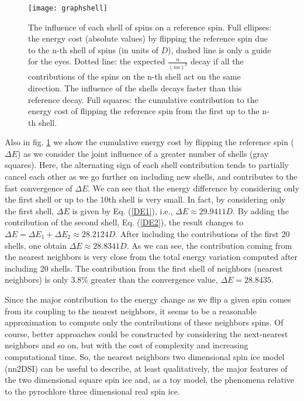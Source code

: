 \documentclass[aps,showkeys,groupedaddress]{revtex4}
\begin{document}
\begin{figure}[ht]
\begin{center}
\texttt{[image: graphshell]}
\end{center}
\caption{The influence of each shell of spins on a reference spin. Full ellipses: the energy cost (absolute values) by flipping the reference spin due to the n-th shell of spins (in units of $D$), dashed line is only a guide for the eyes. Dotted line: the expected $\frac{n}{(na)^3}$ decay if all the contributions of the spins on the n-th shell act on the same direction. The influence of the shells decays faster than this reference decay. Full squares: the cumulative contribution to the energy cost of flipping the reference spin from the first up to the n-th shell.}
\label{figExShell}
\end{figure}

Also in fig. \ref{figExShell} we show the cumulative energy cost by flipping the reference spin ($\Delta E$) as we consider the joint influence of a greater number of shells (gray squares). Here, the alternating sign of each shell contribution tends to partially cancel each other as we go further on including new shells, and contributes to the fast convergence of $\Delta E$. We can see that the energy difference by considering only the first shell or up to the 10th shell is very small. In fact, by considering only the first shell, $\Delta E$ is given by Eq. (\ref{DE1}), i.e., $\Delta E \approx 29.9411 D$. By adding the contribution of the second shell, Eq. (\ref{DE2}), the result changes to $\Delta E = \Delta E_1 + \Delta E_2 \approx 28.2124 D$. After including the contributions of the first 20 shells, one obtain $\Delta E \approx 28.8341 D$. As we can see, the contribution coming from the nearest neighbors is very close from the total energy variation computed after including 20 shells. The contribution from the first shell of neighbors (nearest neighbors) is only $3.8\%$ greater than the convergence value, $\Delta E = 28.8435$.

Since the major contribution to the energy change as we flip a given spin comes from its coupling to the nearest neighbors, it seems to be a reasonable approximation to compute only the contributions of these neighbors spins. Of course, better approaches could be constructed by considering the next-nearest neighbors and so on, but with the cost of complexity and increasing computational time. So, the nearest neighbors two dimensional spin ice model (nn2DSI) \cite{Xie2015} can be useful to describe, at least qualitatively, the major features of the two dimensional square spin ice and, as a toy model, the phenomena relative to the pyrochlore three dimensional real spin ice.
\end{document}

